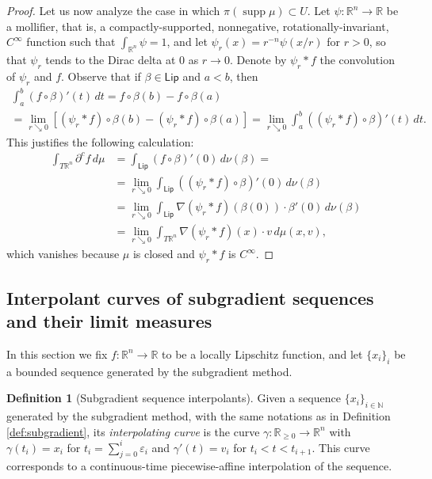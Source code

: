 \documentclass[11pt]{article}
\theoremstyle{definition}
\newtheorem{defn}[thm]{Definition}
\theoremstyle{remark}
\DeclareMathOperator{\supp}{supp}
\newcommand{\R}{\mathbb{R}}
\newcommand{\N}{\mathbb{N}}
\newcommand{\lipschitz}{\mathsf{Lip}}
\renewcommand{\geq}{\geqslant}
\begin{document}
\begin{proof}
 Let us now analyze the case in which $\pi(\supp\mu)\subset U$.
  Let $\psi\colon\R^n\to\R$ be a mollifier, that is, a compactly-supported, nonnegative, rotationally-invariant, $C^\infty$ function such that $\int_{\R^n}\psi=1$, and let $\psi_r(x)=r^{-n}\psi(x/r)$ for $r>0$, so that $\psi_r$ tends to the Dirac delta at 0 as $r\to0$. Denote by $\psi_r*f$ the convolution of $\psi_r$ and $f$. 
 Observe that if $\beta\in \lipschitz$ and $a<b$, then 
 \begin{multline*}
  \int_a^b(f\circ \beta)'(t)\,dt=f\circ\beta(b)-f\circ\beta(a)
  \\=\lim_{r\searrow 0}\left[(\psi_r*f)\circ\beta(b)-(\psi_r*f)\circ\beta(a)\right]
  =\lim_{r\searrow 0}\int_a^b((\psi_r*f)\circ\beta)'(t)\,dt.
 \end{multline*}
 This justifies the following calculation:
 \begin{align*}
  \int_{T\R^n}\partial^cf\,d\mu&=\int_{\lipschitz}(f\circ\beta)'(0)\,d\nu(\beta)=\\
  &=\lim_{r\searrow0}\int_{\lipschitz}((\psi_r*f)\circ\beta)'(0)\,d\nu(\beta) \\
  &=\lim_{r\searrow0}\int_{\lipschitz}\nabla(\psi_r*f)(\beta(0))\cdot\beta'(0)\,d\nu(\beta) \\
  &=\lim_{r\searrow0}\int_{T\R^n}\nabla(\psi_r*f)(x)\cdot v\,d\mu(x,v),
 \end{align*}
 which vanishes because $\mu$ is closed and $\psi_r*f$ is $C^\infty$.
\end{proof}






\subsection{Interpolant curves of subgradient sequences and their limit measures}
\label{sec:interpolatingcurve}



In this section we fix $f\colon\R^n\to\R$ to be a locally Lipschitz function, and let $\{x_i\}_i$ be a bounded sequence generated by the subgradient method.

\begin{defn}[Subgradient sequence interpolants]\label{def:interpolatingcurve}
 Given a sequence $\{x_i\}_{i\in\N}$ generated by the subgradient method, with the same notations as in Definition \ref{def:subgradient},
 its \emph{interpolating curve} is the curve $\gamma\colon\R_{\geq 0}\to\R^n$ with $\gamma(t_i)=x_i$ for $t_i=\sum_{j=0}^{i}\varepsilon_i$ and $\gamma'(t)=v_i$ for $t_i<t<t_{i+1}$. This curve corresponds to a continuous-time piecewise-affine interpolation of the sequence.%
\end{defn}
\end{document}

